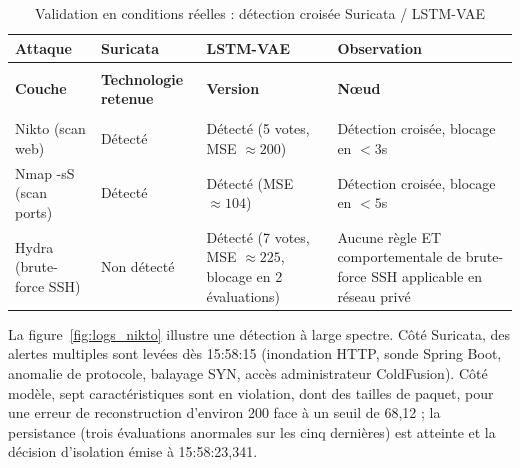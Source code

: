 \begingroup
\renewcommand{\arraystretch}{1.3}
\small
\begin{xltabular}{\textwidth}{|>{\raggedright\arraybackslash}p{3.2cm}|>{\raggedright\arraybackslash}p{2.6cm}|>{\raggedright\arraybackslash}X|>{\raggedright\arraybackslash}X|}

\caption{Validation en conditions réelles : détection croisée Suricata / LSTM-VAE}
\label{tab:validation_attaques_reelles} \\

\hline
{}
\textbf{Attaque} & \textbf{Suricata} & \textbf{LSTM-VAE} & \textbf{Observation} \\ \hline
\endfirsthead

 \\
\hline
{}
\textbf{Couche} & \textbf{Technologie retenue} & \textbf{Version} & \textbf{Nœud} \\ \hline
\endhead

\hline
{} \\
\endfoot

\endlastfoot

Nikto (scan web) & Détecté & Détecté (5 votes, MSE $\approx 200$) & Détection croisée, blocage en $<3$s \\ \hline
Nmap -sS (scan ports) & Détecté & Détecté (MSE $\approx 104$) & Détection croisée, blocage en $<5$s \\ \hline
Hydra (brute-force SSH) & Non détecté & Détecté (7 votes, MSE $\approx 225$, blocage en 2 évaluations) & Aucune règle ET comportementale de brute-force SSH applicable en réseau privé \\ \hline

\end{xltabular}
\endgroup

La figure~\ref{fig:logs_nikto} illustre une détection à large spectre. Côté Suricata, des alertes multiples sont levées dès 15:58:15 (inondation HTTP, sonde Spring Boot, anomalie de protocole, balayage SYN, accès administrateur ColdFusion). Côté modèle, sept caractéristiques sont en violation, dont des tailles de paquet, pour une erreur de reconstruction d'environ 200 face à un seuil de 68,12 ; la persistance (trois évaluations anormales sur les cinq dernières) est atteinte et la décision d'isolation émise à 15:58:23,341.

